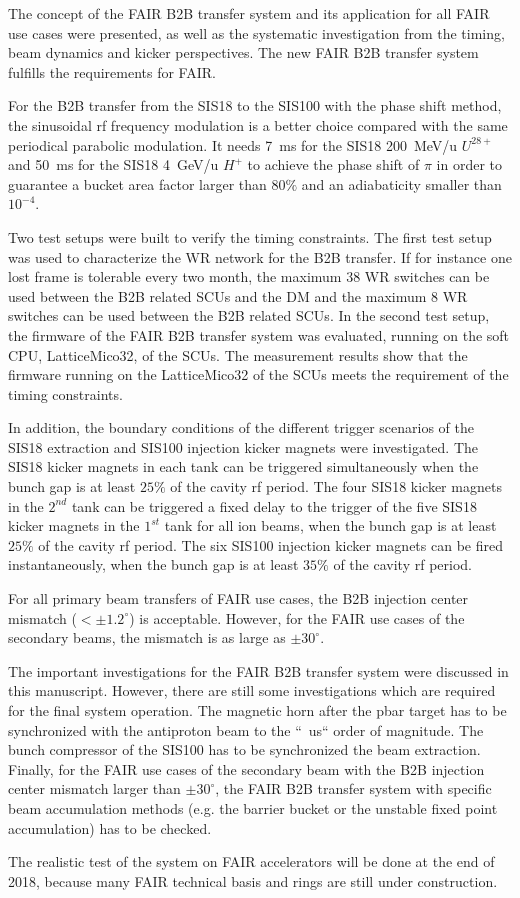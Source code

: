 The concept of the FAIR B2B transfer system and its application for all FAIR use cases were presented, as well as the systematic investigation from the timing, beam dynamics and kicker perspectives. The new FAIR B2B transfer system fulfills the requirements for FAIR. 

For the B2B transfer from the SIS18 to the SIS100 with the phase shift method, the sinusoidal rf frequency modulation is a better choice compared with the same periodical parabolic modulation. It needs \SI{7}{ms} for the SIS18 \SI{200}{MeV/u} $U^\mathit{28+}$ and \SI{50}{ms} for the SIS18 \SI{4}{GeV/u} $H^+$ to achieve the phase shift of $\pi$ in order to guarantee a bucket area factor larger than $80\%$ and an adiabaticity smaller than $10^{-4}$.

Two test setups were built to verify the timing constraints. The first test setup was used to characterize the WR network for the B2B transfer. If for instance one lost frame is tolerable every two month, the maximum 38 WR switches can be used between the B2B related SCUs and the DM and the maximum 8 WR switches can be used between the B2B related SCUs. In the second test setup, the firmware of the FAIR B2B transfer system was evaluated, running on the soft CPU, LatticeMico32, of the SCUs. The measurement results show that the firmware running on the LatticeMico32 of the SCUs meets the requirement of the timing constraints.

In addition, the boundary conditions of the different trigger scenarios of the SIS18 extraction and SIS100 injection kicker magnets were investigated. The SIS18 kicker magnets in each tank can be triggered simultaneously when the bunch gap is at least $25\%$ of the cavity rf period. The four SIS18 kicker magnets in the $2^{nd}$ tank can be triggered a fixed delay to the trigger of the five SIS18 kicker magnets in the $1^{st}$ tank for all ion beams, when the bunch gap is at least $25\%$ of the cavity rf period. The six SIS100 injection kicker magnets can be fired instantaneously, when the bunch gap is at
least $35\%$ of the cavity rf period.  

For all primary beam transfers of FAIR use cases, the B2B injection center mismatch ($<\pm1.2^\circ$) is acceptable. However, for the FAIR use cases of the secondary beams, the mismatch is as large as $\pm30^\circ$. 

The important investigations for the FAIR B2B transfer system were discussed in this manuscript. However, there are still some investigations which are required for the final system operation. The magnetic horn after the pbar target has to be synchronized with the antiproton beam to the ``\SI{}{us}`` order of magnitude. The bunch compressor of the SIS100 has to be synchronized the beam extraction. Finally, for the FAIR use cases of the secondary beam with the B2B injection center mismatch larger than $\pm30^\circ$, the FAIR B2B transfer system with specific beam accumulation methods (e.g. the barrier bucket or the unstable fixed point accumulation) has to be checked. 

The realistic test of the system on FAIR accelerators will be done at the end of 2018, because many FAIR technical basis and rings are still under construction.

